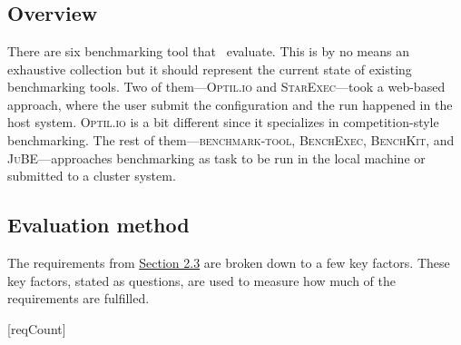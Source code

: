 \chapter{\babTiga}
\label{ch:priorWorks}


\section{Overview}

There are six benchmarking tool that \first~evaluate.
This is by no means an exhaustive collection but it should represent the current state of existing benchmarking tools.
Two of them---\textsc{Optil.io} and \textsc{StarExec}---took a web-based approach, where the user submit the configuration and the run happened in the host system.
\textsc{Optil.io} is a bit different since it specializes in competition-style benchmarking.
The rest of them---\textsc{benchmark-tool}, \textsc{BenchExec}, \textsc{BenchKit}, and \textsc{JuBE}---approaches benchmarking as task to be run in the local machine or submitted to a cluster system.


\section{Evaluation method}

The requirements from \hyperref[sec:idealBenchmarkingTool]{Section 2.3} are broken down to a few key factors.
These key factors, stated as questions, are used to measure how much of the requirements are fulfilled.

[reqCount]
\newcommand{\reqLabel}[1]{
	\setcounter{reqFactorCount}{0}
	\addtocounter{reqCount}{1}
	\arabic{reqCount}.
	#1
}
\newcommand{\reqFactor}[1]{
	\addtocounter{reqFactorCount}{1}
	(\alph{reqFactorCount}) #1
}


